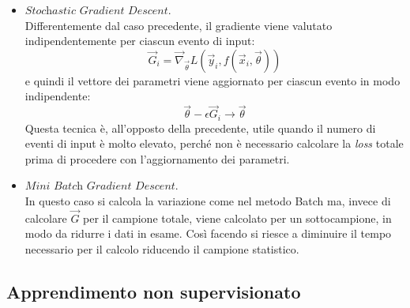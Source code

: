 \begin{itemize}
	\item $\textit{Stochastic Gradient Descent}$. \\
	Differentemente dal caso precedente, il gradiente viene valutato indipendentemente per ciascun evento di input:
	\begin{equation}
	\vec{G}_i =  \vec{\nabla}_{\vec{\theta}} L(\vec{y}_i,f(\vec{x}_i,\vec{\theta})) 
	\end{equation}	
	 e quindi  il vettore dei parametri viene aggiornato per ciascun evento in modo indipendente:
	\begin{equation}
	 \vec{\theta} - \epsilon\vec{G}_i \rightarrow \vec{\theta}
	 \end{equation}
	Questa tecnica è, all'opposto della precedente, utile quando il numero di eventi di input è molto elevato, perché non è necessario calcolare la \textit{loss} totale prima di procedere con l'aggiornamento dei parametri. \\
		
	\item $\textit{Mini Batch Gradient Descent}$. \\
	In questo caso si calcola la variazione come nel metodo Batch ma, invece di calcolare $\vec{G}$ per il campione totale, viene calcolato per un sottocampione, in modo da ridurre i dati in esame. Così facendo si riesce a diminuire il tempo necessario per il calcolo riducendo il campione statistico.
	
\end{itemize}

\newpage


\subsection{Apprendimento non supervisionato}
\label{app_non_sup}

